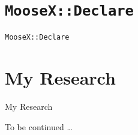 \documentclass[mathserif]{beamer}
\providecommand{\code}[1]{{\texttt{\scriptsize{#1}}}}
\begin{document}
\section{\code{MooseX::Declare}}

\begin{frame}{\code{MooseX::Declare}}

\end{frame}

\section{My Research}

\begin{frame}{My Research}
  \begin{block}{}
    To be continued \ldots
  \end{block}
\end{frame}
\end{document}
